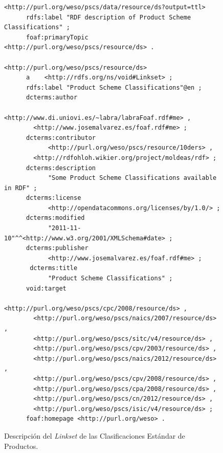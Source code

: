 \begin{figure}[!htp]
\begin{lstlisting} 
<http://purl.org/weso/pscs/data/resource/ds?output=ttl>
      rdfs:label "RDF description of Product Scheme Classifications" ;
      foaf:primaryTopic <http://purl.org/weso/pscs/resource/ds> .

<http://purl.org/weso/pscs/resource/ds>
      a    <http://rdfs.org/ns/void#Linkset> ;
      rdfs:label "Product Scheme Classifications"@en ;
      dcterms:author 
            <http://www.di.uniovi.es/~labra/labraFoaf.rdf#me> , 
	    <http://www.josemalvarez.es/foaf.rdf#me> ;
      dcterms:contributor
            <http://purl.org/weso/pscs/resource/10ders> ,
	    <http://rdfohloh.wikier.org/project/moldeas/rdf> ;
      dcterms:description 
            "Some Product Scheme Classifications available in RDF" ;
      dcterms:license
            <http://opendatacommons.org/licenses/by/1.0/> ;
      dcterms:modified
            "2011-11-10"^^<http://www.w3.org/2001/XMLSchema#date> ;
      dcterms:publisher
            <http://www.josemalvarez.es/foaf.rdf#me> ;
       dcterms:title
            "Product Scheme Classifications" ;
      void:target
            <http://purl.org/weso/pscs/cpc/2008/resource/ds> , 
	    <http://purl.org/weso/pscs/naics/2007/resource/ds> , 
	    <http://purl.org/weso/pscs/sitc/v4/resource/ds> , 
	    <http://purl.org/weso/pscs/cpv/2003/resource/ds> , 
	    <http://purl.org/weso/pscs/naics/2012/resource/ds> , 
	    <http://purl.org/weso/pscs/cpv/2008/resource/ds> , 
	    <http://purl.org/weso/pscs/cpa/2008/resource/ds> , 
	    <http://purl.org/weso/pscs/cn/2012/resource/ds> , 
	    <http://purl.org/weso/pscs/isic/v4/resource/ds> ;
      foaf:homepage <http://purl.org/weso> .	
\end{lstlisting}
	\caption{Descripción del \textit{Linkset} de las Clasificaciones Estándar de Productos.}
	\label{fig:pscs-ls}
\end{figure}


